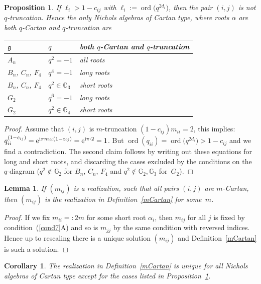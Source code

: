 \documentclass[pdftex]{sigma}%
\numberwithin{equation}{section}
\newtheorem{cor}[teo]{Corollary}
\newtheorem{lem}[teo]{Lemma}
\newtheorem{prop}[teo]{Proposition}
\begin{document}
\begin{prop}\label{prop_CartanTrunc} If $\ell_i > 1- c_{ij}$ with $\ell_i := \operatorname{ord}\big(q^{2d_i}\big)$, then the pair $(i,j)$ is not $q$-truncation. Hence the only Nichols algebras of Cartan type, where roots $\alpha$ are both $q$-Cartan and $q$-truncation are
\begin{center}\renewcommand{\arraystretch}{1.2}
	\begin{tabular}{lll}
	$\mathfrak{g}$ & $q$ & both $q$-Cartan and $q$-truncation\\
	 \hline
	 $A_n$ & $q^2=-1$ & all roots \\
	 $B_n$, $C_n$, $F_4$ & $q^4=-1$ & long roots \\
	 $B_n$, $C_n$, $F_4$ & $q^2\in\mathbb{G}_3$ & short roots \\
	 $G_2$ & $q^6=-1$ & long roots \\
	 $G_2$ & $q^2\in \mathbb{G}_4$ & short roots \\
	\end{tabular}
\end{center}
\end{prop}
\begin{proof} Assume that $(i,j)$ is $m$-truncation $(1-c_{ij})m_{ii} = 2$, this implies: $q_{ii}^{(1-c_{ij})}={\rm e}^{{\rm i}\pi m_{ii}(1-c_{ij})}={\rm e}^{{\rm i}\pi \cdot 2}=1$. But $\operatorname{ord}(q_{ii})= \operatorname{ord}\big(q^{2d_i}\big) > 1- c_{ij}$ and we find a contradiction. The second claim follows by writing out these equations for long and short roots, and discarding the cases excluded by the conditions on the $q$-diagram ($q^2\not\in\mathbb{G}_2$ for $B_n$, $C_n$, $F_4$ and $q^2\not\in \mathbb{G}_2,\mathbb{G}_3$ for~$G_2$).
\end{proof}

\begin{lem}\label{cartanclassification}
If $(m_{ij})$ is a realization, such that all pairs $(i,j)$ are $m$-Cartan, then $(m_{ij})$ is the realization in Definition~{\rm \ref{mCartan}} for some~$m$.
\end{lem}
\begin{proof} If we fix $m_{ii}=:2m$ for some short root $\alpha_i$, then $m_{ij}$ for all $j$ is fixed by condition~(\ref{cond7}A) and so is $m_{jj}$ by the same condition with reversed indices. Hence up to rescaling there is a unique solution $(m_{ij})$ and Definition~\ref{mCartan} is such a solution.
\end{proof}
\begin{cor}The realization in Definition~{\rm \ref{mCartan}} is unique for all Nichols algebras of Cartan type except for the cases listed in Proposition~{\rm \ref{prop_CartanTrunc}}.
\end{cor}
\end{document}
